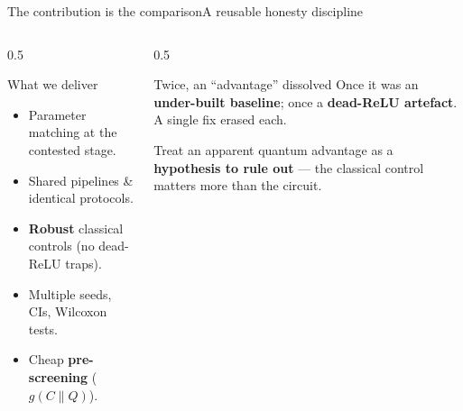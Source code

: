 \begin{frame}{The contribution is the comparison}{A reusable honesty discipline}
    \begin{columns}[T]
        \begin{column}{0.5\textwidth}
            \begin{block}{What we deliver}
                \begin{itemize}
                    \item Parameter matching at the contested stage.
                    \item Shared pipelines \& identical protocols.
                    \item \textbf{Robust} classical controls (no dead-ReLU traps).
                    \item Multiple seeds, CIs, Wilcoxon tests.
                    \item Cheap \textbf{pre-screening} ($g(C\|Q)$).
                \end{itemize}
            \end{block}
        \end{column}
        \begin{column}{0.5\textwidth}
            \begin{alertblock}{Twice, an ``advantage'' dissolved}
                Once it was an \textbf{under-built baseline}; once a
                \textbf{dead-ReLU artefact}. A single fix erased each.
            \end{alertblock}
            \begin{callout}
                Treat an apparent quantum advantage as a \textbf{hypothesis to rule
                    out} --- the classical control matters more than the circuit.
            \end{callout}
        \end{column}
    \end{columns}
\end{frame}

